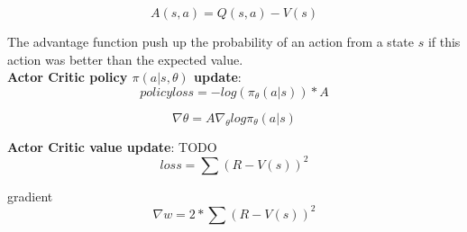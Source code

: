 \begin{equation}
	A(s, a) = Q(s, a) - V(s)
\end{equation}

The advantage function push up the probability of an action from a state $s$ if this action was better than the expected value.\\


\textbf{Actor Critic policy $\pi(a | s, \theta)$ update}:
\begin{equation}
	policy loss = - log (\pi_\theta(a | s)) * A
\end{equation}

\begin{equation}
	\nabla \theta = A \nabla_\theta log \pi_\theta (a | s)
\end{equation}
	
\textbf{Actor Critic value update}:
TODO
\begin{equation}
	loss = \sum(R - V(s))^2
\end{equation}

gradient
\begin{equation}
	\nabla w =  2 * \sum(R - V(s))^2
\end{equation}



		

